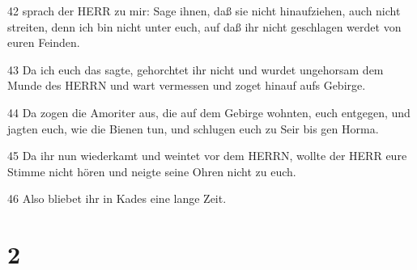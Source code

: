 \par 42 sprach der HERR zu mir: Sage ihnen, daß sie nicht hinaufziehen, auch nicht streiten, denn ich bin nicht unter euch, auf daß ihr nicht geschlagen werdet von euren Feinden.
\par 43 Da ich euch das sagte, gehorchtet ihr nicht und wurdet ungehorsam dem Munde des HERRN und wart vermessen und zoget hinauf aufs Gebirge.
\par 44 Da zogen die Amoriter aus, die auf dem Gebirge wohnten, euch entgegen, und jagten euch, wie die Bienen tun, und schlugen euch zu Seir bis gen Horma.
\par 45 Da ihr nun wiederkamt und weintet vor dem HERRN, wollte der HERR eure Stimme nicht hören und neigte seine Ohren nicht zu euch.
\par 46 Also bliebet ihr in Kades eine lange Zeit.

\chapter{2}

